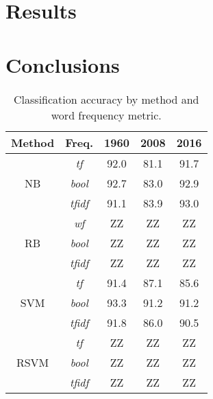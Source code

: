 \documentclass[aps, prl, reprint, showpacs]{revtex4-1}
\begin{document}
\section{Results}

\section{Conclusions}


\begin{table} %
  \label{tab:results}
  \begin{ruledtabular}
  \begin{tabular}{ccccc}
  Method & Freq.& 1960 & 2008 & 2016 \\
    \hline
 & \textit{tf} & 92.0  & 81.1 & 91.7 \\
NB & \textit{bool} & 92.7  & 83.0 & 92.9 \\
 & \textit{tfidf} & 91.1  & 83.9 & 93.0 \\
 \hline
 & \textit{wf} & ZZ  & ZZ & ZZ \\
RB & \textit{bool} & ZZ  & ZZ & ZZ \\
 & \textit{tfidf} & ZZ  & ZZ & ZZ \\
 \hline
 & \textit{tf} & 91.4 & 87.1 & 85.6 \\
SVM & \textit{bool} & 93.3 & 91.2 & 91.2 \\
 & \textit{tfidf} & 91.8 & 86.0 & 90.5 \\
 \hline
  & \textit{tf} & ZZ  & ZZ & ZZ \\
RSVM & \textit{bool} & ZZ  & ZZ & ZZ \\
 & \textit{tfidf} & ZZ  & ZZ & ZZ \\
 \hline
  \end{tabular}
  \end{ruledtabular}
    \caption{Classification accuracy by method and word frequency metric.}
\end{table}
\end{document}
